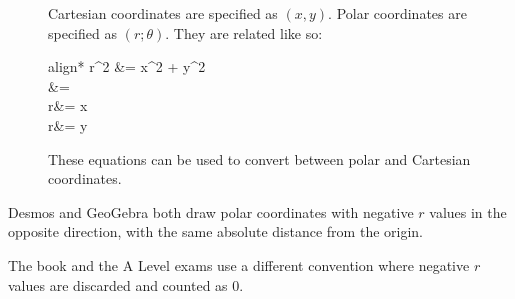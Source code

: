 \documentclass[../main.tex]{subfile}
\begin{document}
\tikzset{/tkzmkangle/mark=none}



\begin{figure}[H]
	\begin{minipage}{0.45\linewidth}
	\begin{center}
	\end{center}
	\end{minipage}\hfill
	\begin{minipage}{0.5\linewidth}
		\setlength{\parskip}{1em}
		Cartesian coordinates are specified as $(x, y)$. Polar coordinates are specified as $(r; \theta)$. They are related like so:
		\begin{empheq}[box=\rememberBox]{align*}
			\displaystyle
			r^2 &= x^2 + y^2\\
			\tan\theta &= \\
			r\cos\theta &= x\\
			r\sin\theta &= y
		\end{empheq}

		These equations can be used to convert between polar and Cartesian coordinates.
	\end{minipage}
\end{figure}


Desmos and GeoGebra both draw polar coordinates with negative $r$ values in the opposite direction, with the same absolute distance from the origin.

The book and the A Level exams use a different convention where negative $r$ values are discarded and counted as 0.
\end{document}
